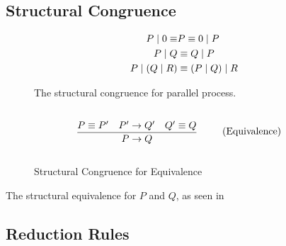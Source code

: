 \subsection{Structural Congruence}
\begin{figure}[h]
    \begin{align*}
        P\mid 0 \equiv &P \equiv 0\mid P\\
        P\mid Q &\equiv Q\mid P\\
        P\mid (Q\mid R)&\equiv (P\mid Q)\mid R
    \end{align*}
    \caption{The structural congruence for parallel process.}
\end{figure}


\begin{figure}[h]
    \begin{align}
        & \infrule{P\equiv P'\quad P'\ra Q'\quad Q'\equiv Q}{P\ra Q} \tag{Equivalence}
    \end{align}
    \caption{Structural Congruence for Equivalence}
    \label{fig:equi}
\end{figure}
\noindent
The structural equivalence for $P$ and $Q$, as seen in 
\FloatBarrier

\subsection{Reduction Rules}


